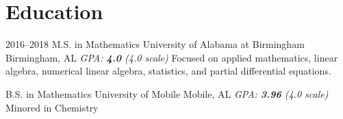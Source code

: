 %
%
% 

\section{Education}
\cventry
{2016--2018}
{M.S. in Mathematics}
{University of Alabama at Birmingham}
{Birmingham, AL}
{\textit{GPA: \textbf{4.0} (4.0 scale)}}
{Focused on applied mathematics, linear algebra, numerical linear algebra, statistics, and partial differential equations.}  %

{B.S. in Mathematics}
{University of Mobile}
{Mobile, AL}
{\textit{GPA: \textbf{3.96} (4.0 scale)}}
{Minored in Chemistry}
